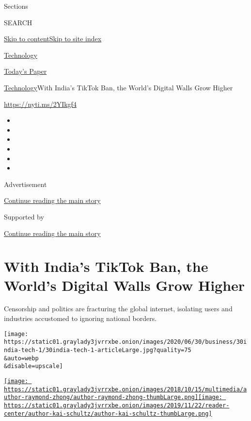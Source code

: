 Sections

SEARCH

\protect\hyperlink{site-content}{Skip to
content}\protect\hyperlink{site-index}{Skip to site index}

\href{https://www.nytimes3xbfgragh.onion/section/technology}{Technology}

\href{https://myaccount.nytimes3xbfgragh.onion/auth/login?response_type=cookie\&client_id=vi}{}

\href{https://www.nytimes3xbfgragh.onion/section/todayspaper}{Today's
Paper}

\href{/section/technology}{Technology}\textbar{}With India's TikTok Ban,
the World's Digital Walls Grow Higher

\url{https://nyti.ms/2YIkgf4}

\begin{itemize}
\item
\item
\item
\item
\item
\item
\end{itemize}

Advertisement

\protect\hyperlink{after-top}{Continue reading the main story}

Supported by

\protect\hyperlink{after-sponsor}{Continue reading the main story}

\hypertarget{with-indias-tiktok-ban-the-worlds-digital-walls-grow-higher}{%
\section{With India's TikTok Ban, the World's Digital Walls Grow
Higher}\label{with-indias-tiktok-ban-the-worlds-digital-walls-grow-higher}}

Censorship and politics are fracturing the global internet, isolating
users and industries accustomed to ignoring national borders.

\texttt{[image: https://static01.graylady3jvrrxbe.onion/images/2020/06/30/business/30india-tech-1/30india-tech-1-articleLarge.jpg?quality=75\\\&auto=webp\\\&disable=upscale]}

\href{https://www.nytimes3xbfgragh.onion/by/raymond-zhong}{\texttt{[image: https://static01.graylady3jvrrxbe.onion/images/2018/10/15/multimedia/author-raymond-zhong/author-raymond-zhong-thumbLarge.png]}}\href{https://www.nytimes3xbfgragh.onion/by/kai-schultz}{\texttt{[image: https://static01.graylady3jvrrxbe.onion/images/2019/11/22/reader-center/author-kai-schultz/author-kai-schultz-thumbLarge.png]}}


